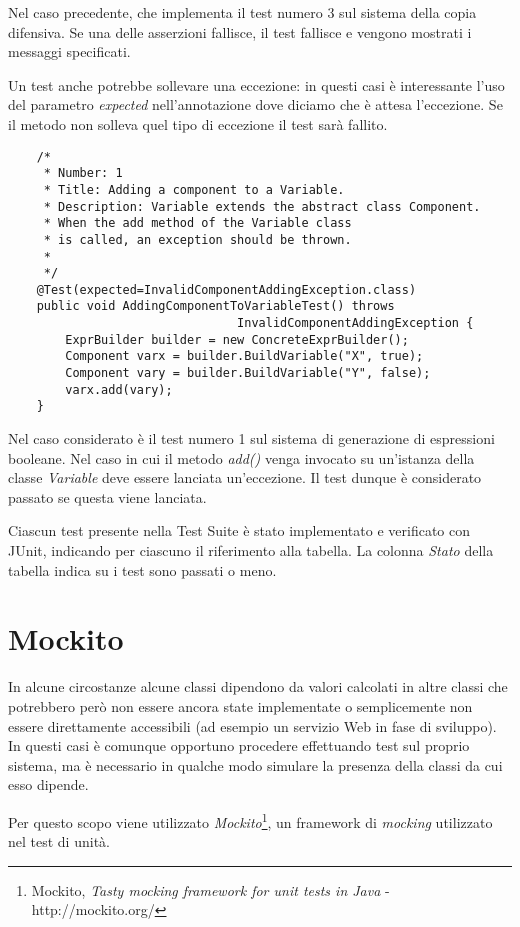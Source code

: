Nel caso precedente, che implementa il test numero 3 sul sistema della copia difensiva. Se una delle asserzioni fallisce, il test fallisce e vengono mostrati i messaggi specificati.

Un test anche potrebbe sollevare una eccezione: in questi casi è interessante l'uso del parametro \emph{expected} nell'annotazione dove diciamo che è attesa l'eccezione. Se il metodo non solleva quel tipo di eccezione il test sarà fallito.

\begin{lstlisting}
	/*
	 * Number: 1
	 * Title: Adding a component to a Variable.
	 * Description: Variable extends the abstract class Component. 
	 * When the add method of the Variable class 
	 * is called, an exception should be thrown.
	 * 
	 */
	@Test(expected=InvalidComponentAddingException.class)
	public void AddingComponentToVariableTest() throws 
								InvalidComponentAddingException {		
		ExprBuilder builder = new ConcreteExprBuilder();
		Component varx = builder.BuildVariable("X", true);
		Component vary = builder.BuildVariable("Y", false);
		varx.add(vary);
	}
\end{lstlisting}

Nel caso considerato è il test numero 1 sul sistema di generazione di espressioni booleane. Nel caso in cui il metodo \emph{add()} venga invocato su un'istanza della classe \emph{Variable} deve essere lanciata un'eccezione. Il test dunque è considerato passato se questa viene lanciata. 

Ciascun test presente nella Test Suite è stato implementato e verificato con JUnit, indicando per ciascuno il riferimento alla tabella. La colonna \emph{Stato} della tabella indica su i test sono passati o meno.

\section{Mockito}

In alcune circostanze alcune classi dipendono da valori calcolati in altre classi che potrebbero però non essere ancora state implementate o semplicemente non essere direttamente accessibili (ad esempio un servizio Web in fase di sviluppo). In questi casi è comunque opportuno procedere effettuando test sul proprio sistema, ma è necessario in qualche modo simulare la presenza della classi da cui esso dipende.

Per questo scopo viene utilizzato \emph{Mockito}\footnote{Mockito, \emph{Tasty mocking framework for unit tests in Java} - http://mockito.org/}, un framework di \emph{mocking} utilizzato nel test di unità.

